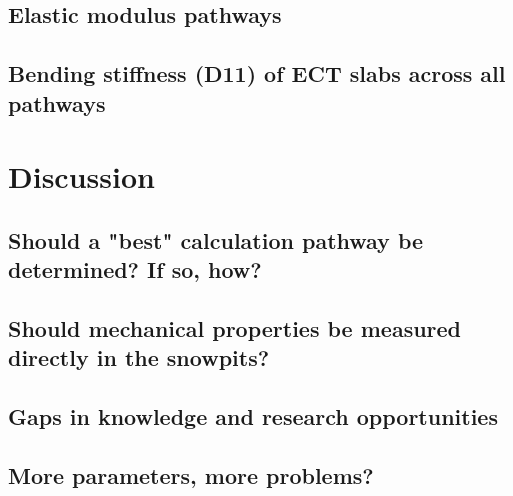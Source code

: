 \documentclass[hess, manuscript]{copernicus}
\begin{document}


\subsection{Elastic modulus pathways}






\subsection{Bending stiffness (D11) of ECT slabs across all pathways}





\section{Discussion}

\subsection{Should a "best" calculation pathway be determined? If so, how?}


\subsection{Should mechanical properties be measured directly in the snowpits?}

\subsection{Gaps in knowledge and research opportunities}

\subsection{More parameters, more problems?}
\end{document}

